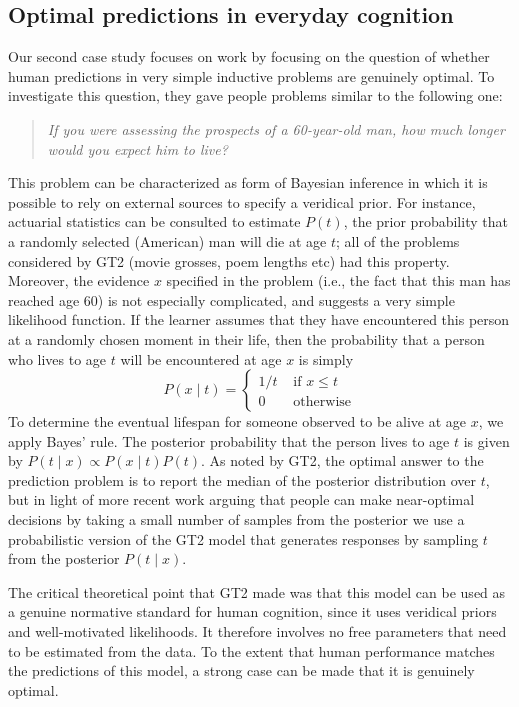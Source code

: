 \subsection*{Optimal predictions in everyday cognition}

Our second case study focuses on work by  focusing on the question of whether human predictions in very simple inductive problems are genuinely optimal. To investigate this question, they gave people problems similar to the following one:
\begin{quote}
{\it If you were assessing the prospects of a 60-year-old man, how much longer would you expect him to live?}
\end{quote}
This problem can be characterized as form of Bayesian inference in which it is possible to rely on external sources to specify a veridical prior. For instance, actuarial statistics can be consulted to estimate $P(t)$, the prior probability that a randomly selected (American) man will die at age $t$; all of the problems considered by GT2 (movie grosses, poem lengths etc) had this property. Moreover, the evidence $x$ specified in the problem (i.e., the fact that this man has reached age 60) is not especially complicated, and suggests a very simple likelihood function. If the learner assumes that they have encountered this person at a randomly chosen moment in their life, then the probability that a person who lives to age $t$ will be encountered at age $x$ is simply
\begin{equation}
P(x \mid t) = \left\{ \begin{array}{rl} 1/t & \mbox{ if } x\leq t \\ 
0 & \mbox{ otherwise} \end{array} \right.
\end{equation}
To determine the eventual lifespan for someone observed to be alive at age $x$, we apply Bayes' rule. The posterior probability that the person lives to age $t$ is given by
$
P( t \mid x ) \propto P(x \mid t) P(t)
$.
As noted by GT2, the optimal answer to the prediction problem is to report the median of the posterior distribution over $t$, but in light of more recent work arguing that people can make near-optimal decisions by taking a small number of samples from the posterior \cite{vul_one_2014} we use a probabilistic version of the GT2 model that generates responses by sampling $t$ from the posterior $P(t \mid x)$.

The critical theoretical point that GT2 made was that this model can be used as a genuine normative standard for human cognition, since it uses veridical priors and well-motivated likelihoods. It therefore involves no free parameters that need to be estimated from the data. To the extent that human performance matches the predictions of this model, a strong case can be made that it is genuinely optimal. 



